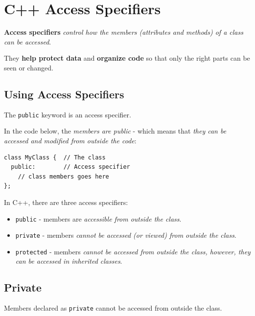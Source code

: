 \documentclass[../basic_programs.tex]{subfiles}
\begin{document}
    \section{C++ Access Specifiers}

    \begin{mydef}
        \textbf{Access specifiers} \textit{control how the members (attributes and methods) of a class can be accessed}.
    \end{mydef}

    They \textbf{help protect data} and \textbf{organize code} so that only the right parts can be seen or changed.

    \subsection{Using Access Specifiers}

    The \lstinline|public| keyword is an access specifier.

    \begin{exa}
        In the code below, the \textit{members are public} - which means that \textit{they can be accessed and modified from outside the code}:
        \begin{lstlisting}[caption={caption},label=DescriptiveLabel]
class MyClass {  // The class
  public:        // Access specifier
    // class members goes here
};
        \end{lstlisting}
    \end{exa}

    In C++, there are three access specifiers:

    \begin{itemize}
        \item \lstinline|public| - members are \textit{accessible from outside the class}.
        \item \lstinline|private| - members \textit{cannot be accessed (or viewed) from outside the class}.
        \item \lstinline|protected| - members \textit{cannot be accessed from outside the class, however, they can be accessed in inherited classes}.
    \end{itemize}

    \subsection{Private}

    Members declared as \lstinline|private| cannot be accessed from outside the class.
\end{document}
